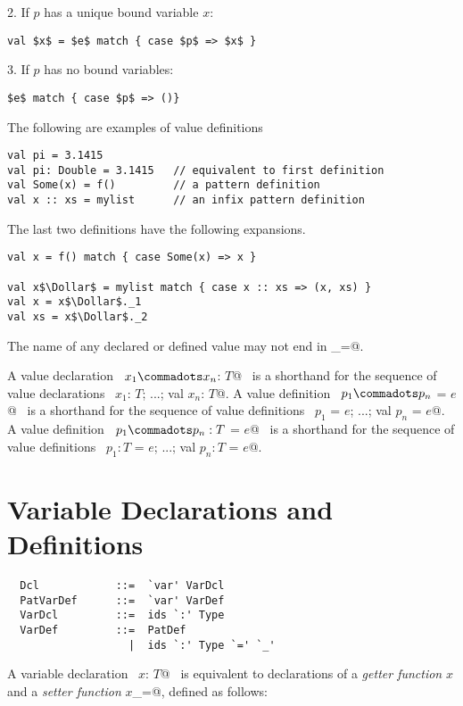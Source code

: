 2. If $p$ has a unique bound variable $x$:
\begin{lstlisting}
val $x$ = $e$ match { case $p$ => $x$ }
\end{lstlisting}

3. If $p$ has no bound variables:
\begin{lstlisting}
$e$ match { case $p$ => ()}
\end{lstlisting}

\example
The following are examples of value definitions
\begin{lstlisting}
val pi = 3.1415 
val pi: Double = 3.1415   // equivalent to first definition
val Some(x) = f()         // a pattern definition
val x :: xs = mylist      // an infix pattern definition
\end{lstlisting}

The last two definitions have the following expansions.
\begin{lstlisting}
val x = f() match { case Some(x) => x }

val x$\Dollar$ = mylist match { case x :: xs => (x, xs) }
val x = x$\Dollar$._1 
val xs = x$\Dollar$._2 
\end{lstlisting}

The name of any declared or defined value may not end in \lstinline@_=@.

A value declaration ~\lstinline@val $x_1 \commadots x_n$: $T$@~
is a
shorthand for the sequence of value declarations
~\lstinline@val $x_1$: $T$; ...; val $x_n$: $T$@.
A value definition ~\lstinline@val $p_1 \commadots p_n$ = $e$@~
is a
shorthand for the sequence of value definitions
~\lstinline@val $p_1$ = $e$; ...; val $p_n$ = $e$@.
A value definition ~\lstinline@val $p_1 \commadots p_n: T$ = $e$@~
is a
shorthand for the sequence of value definitions
~\lstinline@val $p_1: T$ = $e$; ...; val $p_n: T$ = $e$@.

\section{Variable Declarations and Definitions}
\label{sec:vardef}

\syntax\begin{lstlisting}
  Dcl            ::=  `var' VarDcl
  PatVarDef      ::=  `var' VarDef
  VarDcl         ::=  ids `:' Type
  VarDef         ::=  PatDef
                   |  ids `:' Type `=' `_'
\end{lstlisting}

A variable declaration ~\lstinline@var $x$: $T$@~ is equivalent to declarations
of a {\em getter function} $x$ and a {\em setter function}
\lstinline@$x$_=@, defined as follows:

